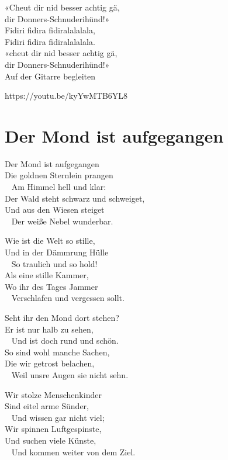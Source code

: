 \documentclass[
  letterpaper,
  twoside=false]{scrbook}
\begin{document}
«Cheut dir nid besser achtig gä,\\
dir Donners-Schnuderihünd!»\\
Fidiri fidira fidiralalalala,\\
Fidiri fidira fidiralalalala.\\
«cheut dir nid besser achtig gä,\\
dir Donners-Schnuderihünd!»\\
Auf der Gitarre begleiten

https://youtu.be/kyYwMTB6YL8

\hypertarget{der-mond-ist-aufgegangen}{%
\chapter{Der Mond ist aufgegangen}\label{der-mond-ist-aufgegangen}}

Der Mond ist aufgegangen\\
Die goldnen Sternlein prangen\\
\hspace*{0.333em} ~ Am Himmel hell und klar:\\
Der Wald steht schwarz und schweiget,\\
Und aus den Wiesen steiget\\
\hspace*{0.333em} ~ Der weiße Nebel wunderbar.

Wie ist die Welt so stille,\\
Und in der Dämmrung Hülle\\
\hspace*{0.333em} ~ So traulich und so hold!\\
Als eine stille Kammer,\\
Wo ihr des Tages Jammer\\
\hspace*{0.333em} ~ Verschlafen und vergessen sollt.

Seht ihr den Mond dort stehen?\\
Er ist nur halb zu sehen,\\
\hspace*{0.333em} ~ Und ist doch rund und schön.\\
So sind wohl manche Sachen,\\
Die wir getrost belachen,\\
\hspace*{0.333em} ~ Weil unsre Augen sie nicht sehn.

Wir stolze Menschenkinder\\
Sind eitel arme Sünder,\\
\hspace*{0.333em} ~ Und wissen gar nicht viel;\\
Wir spinnen Luftgespinste,\\
Und suchen viele Künste,\\
\hspace*{0.333em} ~ Und kommen weiter von dem Ziel.
\end{document}
